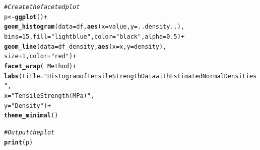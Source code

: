 \documentclass{article}\usepackage[]{graphicx}\usepackage[]{xcolor}
\makeatletter
\newcommand{\hlnum}[1]{\textcolor[rgb]{0.686,0.059,0.569}{#1}}%
\newcommand{\hlsng}[1]{\textcolor[rgb]{0.192,0.494,0.8}{#1}}%
\newcommand{\hlcom}[1]{\textcolor[rgb]{0.678,0.584,0.686}{\textit{#1}}}%
\newcommand{\hlopt}[1]{\textcolor[rgb]{0,0,0}{#1}}%
\newcommand{\hldef}[1]{\textcolor[rgb]{0.345,0.345,0.345}{#1}}%
\newcommand{\hlkwb}[1]{\textcolor[rgb]{0.69,0.353,0.396}{#1}}%
\newcommand{\hlkwc}[1]{\textcolor[rgb]{0.333,0.667,0.333}{#1}}%
\newcommand{\hlkwd}[1]{\textcolor[rgb]{0.737,0.353,0.396}{\textbf{#1}}}%
\newenvironment{kframe}{%
 \def\at@end@of@kframe{}%
 \ifinner\ifhmode%
  \def\at@end@of@kframe{\end{minipage}}%
  \begin{minipage}{\columnwidth}%
 \fi\fi%
 \def\FrameCommand##1{\hskip\@totalleftmargin \hskip-\fboxsep
 \colorbox{shadecolor}{##1}\hskip-\fboxsep
     \hskip-\linewidth \hskip-\@totalleftmargin \hskip\columnwidth}%
 \MakeFramed {\advance\hsize-\width
   \@totalleftmargin\z@ \linewidth\hsize
   \@setminipage}}%
 {\par\unskip\endMakeFramed%
 \at@end@of@kframe}
\newenvironment{knitrout}{}{} %
\makeatother
\begin{document}
\begin{knitrout}
\begin{kframe}
\begin{alltt}
\hlcom{# Create the faceted plot}
\hldef{p} \hlkwb{<-} \hlkwd{ggplot}\hldef{()} \hlopt{+}
  \hlkwd{geom_histogram}\hldef{(}\hlkwc{data} \hldef{= df,} \hlkwd{aes}\hldef{(}\hlkwc{x} \hldef{= value,} \hlkwc{y} \hldef{= ..density..),}
                 \hlkwc{bins} \hldef{=} \hlnum{15}\hldef{,} \hlkwc{fill} \hldef{=} \hlsng{"lightblue"}\hldef{,} \hlkwc{color} \hldef{=} \hlsng{"black"}\hldef{,} \hlkwc{alpha} \hldef{=} \hlnum{0.5}\hldef{)} \hlopt{+}
  \hlkwd{geom_line}\hldef{(}\hlkwc{data} \hldef{= df_density,} \hlkwd{aes}\hldef{(}\hlkwc{x} \hldef{= x,} \hlkwc{y} \hldef{= density),}
            \hlkwc{size} \hldef{=} \hlnum{1}\hldef{,} \hlkwc{color} \hldef{=} \hlsng{"red"}\hldef{)} \hlopt{+}
  \hlkwd{facet_wrap}\hldef{(}\hlopt{~} \hldef{Method)} \hlopt{+}
  \hlkwd{labs}\hldef{(}\hlkwc{title} \hldef{=} \hlsng{"Histogram of Tensile Strength Data with Estimated Normal Densities"}\hldef{,}
       \hlkwc{x} \hldef{=} \hlsng{"Tensile Strength (MPa)"}\hldef{,}
       \hlkwc{y} \hldef{=} \hlsng{"Density"}\hldef{)} \hlopt{+}
  \hlkwd{theme_minimal}\hldef{()}
\end{alltt}


{\ttfamily\noindent\color{warningcolor}{\#\# Warning: Using `size` aesthetic for lines was deprecated in ggplot2 3.4.0.\\\#\# i Please use `linewidth` instead.\\\#\# This warning is displayed once every 8 hours.\\\#\# Call `lifecycle::last\_lifecycle\_warnings()` to see where this warning was\\\#\# generated.}}\begin{alltt}
\hlcom{# Output the plot}
\hlkwd{print}\hldef{(p)}
\end{alltt}



\end{kframe}
\end{knitrout}
\end{document}
